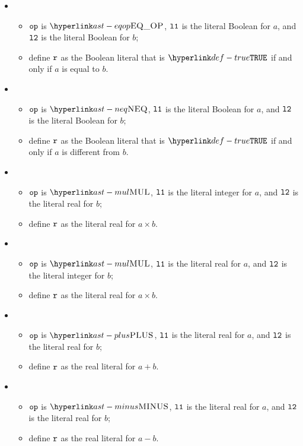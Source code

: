 \begin{itemize}
  \item {}
  \begin{itemize}
    \item $\texttt{op}$ is $\EQOP$, $\texttt{l1}$ is the literal Boolean for $a$, and $\texttt{l2}$ is the literal Boolean for $b$;
    \item define $\texttt{r}$ as the Boolean literal that is $\True$ if and only if $a$ is equal to $b$.
  \end{itemize}

  \item {}
  \begin{itemize}
    \item $\texttt{op}$ is $\NEQ$, $\texttt{l1}$ is the literal Boolean for $a$, and $\texttt{l2}$ is the literal Boolean for $b$;
    \item define $\texttt{r}$ as the Boolean literal that is $\True$ if and only if $a$ is different from $b$.
  \end{itemize}

  \item {}
  \begin{itemize}
    \item $\texttt{op}$ is $\MUL$, $\texttt{l1}$ is the literal integer for $a$, and $\texttt{l2}$ is the literal real for $b$;
    \item define $\texttt{r}$ as the literal real for $a\times b$.
  \end{itemize}

  \item {}
  \begin{itemize}
    \item $\texttt{op}$ is $\MUL$, $\texttt{l1}$ is the literal real for $a$, and $\texttt{l2}$ is the literal integer for $b$;
    \item define $\texttt{r}$ as the literal real for $a\times b$.
  \end{itemize}

  \item {}
  \begin{itemize}
    \item $\texttt{op}$ is $\PLUS$, $\texttt{l1}$ is the literal real for $a$, and $\texttt{l2}$ is the literal real for $b$;
    \item define $\texttt{r}$ as the real literal for $a + b$.
  \end{itemize}

  \item {}
  \begin{itemize}
    \item $\texttt{op}$ is $\MINUS$, $\texttt{l1}$ is the literal real for $a$, and $\texttt{l2}$ is the literal real for $b$;
    \item define $\texttt{r}$ as the real literal for $a - b$.
  \end{itemize}


\end{itemize}
